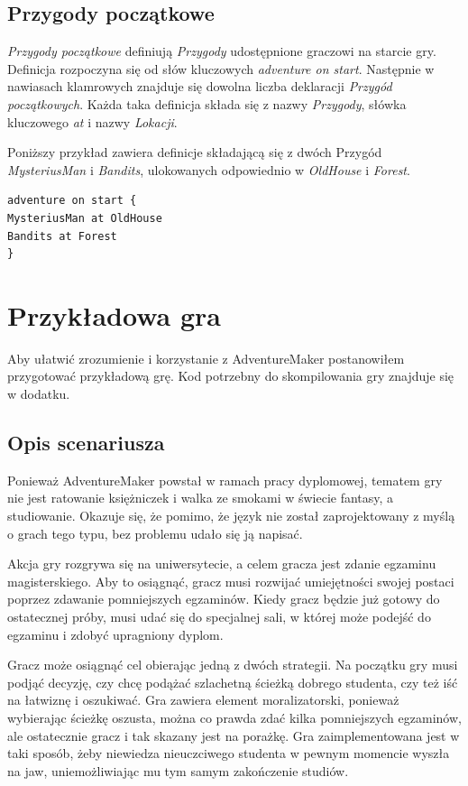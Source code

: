 \documentclass[openright]{xmgr}
\begin{document}
\section{Przygody początkowe} 
\textit{Przygody początkowe} definiują \textit{Przygody} udostępnione graczowi na starcie gry. Definicja rozpoczyna się od słów kluczowych \textit{adventure on start}. Następnie w nawiasach klamrowych znajduje się dowolna liczba deklaracji \textit{Przygód początkowych}.
Każda taka definicja składa się z nazwy \textit{Przygody}, słówka kluczowego \textit{at} i nazwy \textit{Lokacji}.

Poniższy przykład zawiera definicje składającą się z dwóch Przygód \textit{MysteriusMan} i \textit{Bandits}, ulokowanych odpowiednio w \textit{OldHouse} i \textit{Forest}.

\begin{verbatim}
adventure on start {
MysteriusMan at OldHouse
Bandits at Forest
}
\end{verbatim}

\chapter{Przykładowa gra}
Aby ułatwić zrozumienie i korzystanie z AdventureMaker postanowiłem przygotować przykładową grę. Kod potrzebny do skompilowania gry znajduje się w dodatku.

\section{Opis scenariusza}

Ponieważ AdventureMaker powstał w ramach pracy dyplomowej, tematem gry nie jest ratowanie księżniczek i walka ze smokami w świecie fantasy, a studiowanie. Okazuje się, że pomimo, że język nie został zaprojektowany z myślą o grach tego typu, bez problemu udało się ją napisać.

Akcja gry rozgrywa się na uniwersytecie, a celem gracza jest zdanie egzaminu magisterskiego. Aby to osiągnąć, gracz musi rozwijać umiejętności swojej postaci poprzez zdawanie pomniejszych egzaminów. Kiedy gracz będzie już gotowy do ostatecznej próby, musi udać się do specjalnej sali, w której może podejść do egzaminu i zdobyć upragniony dyplom.

Gracz może osiągnąć cel obierając jedną z dwóch strategii. Na początku gry musi podjąć decyzję, czy chcę podążać szlachetną ścieżką dobrego studenta, czy też iść na łatwiznę i oszukiwać. Gra zawiera element moralizatorski, ponieważ wybierając ścieżkę oszusta, można co prawda zdać kilka pomniejszych egzaminów, ale ostatecznie gracz i tak skazany jest na porażkę. Gra zaimplementowana jest w taki sposób, żeby niewiedza nieuczciwego studenta w pewnym momencie wyszła na jaw, uniemożliwiając mu tym samym zakończenie studiów.
\end{document}
